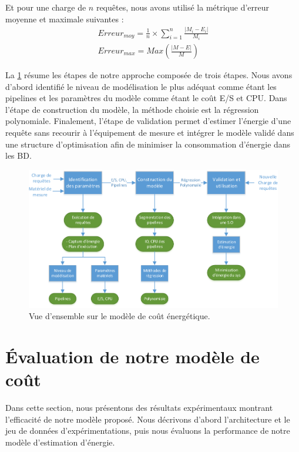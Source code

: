 Et pour une charge de $n$ requêtes, nous avons utilisé la métrique d'erreur moyenne et maximale suivantes : %
\begin{equation}
\begin{aligned}
 Erreur_{moy} = \frac{1}{n} \times \sum_{i=1}^{n} \frac{|M_i - E_i|}{M_i} \\
 Erreur_{max} = Max (\frac{|M - E|}{M})
\end{aligned}
\end{equation}

La \ref{fig:power-model} résume les étapes de notre approche composée de trois étapes.  Nous avons d'abord identifié le niveau de modélisation le plus adéquat comme étant les pipelines et les paramètres du modèle comme étant le coût E/S et CPU. Dans l'étape de construction du modèle, la méthode choisie est la régression polynomiale. Finalement, l'étape de validation permet d'estimer l'énergie d'une requête sans recourir à l'équipement de mesure et intégrer le modèle validé dans une structure d'optimisation afin de minimiser la consommation d'énergie dans les BD. 

\begin{figure}
 \centering
 \includegraphics[scale=0.80]{chapitre4/chap4Fig/costmodel-methodology-final.pdf} %
 \caption{Vue d'ensemble sur le modèle de coût énergétique.}
 \label{fig:power-model}
\end{figure}

\section{Évaluation de notre modèle de coût}\label{sec:experiment}
Dans cette section, nous présentons des résultats expérimentaux montrant l'efficacité de notre modèle proposé. Nous décrivons d'abord l'architecture et le jeu de données d'expérimentations, puis nous évaluons la performance de notre modèle d'estimation d'énergie.

